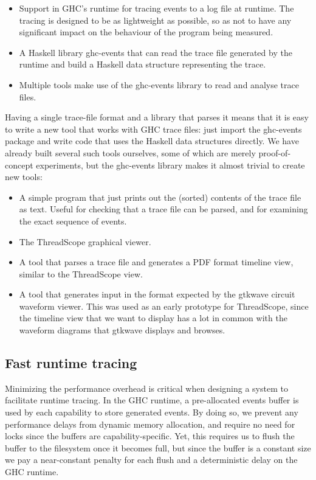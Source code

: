 \documentclass[twocolumn,9pt]{sigplanconf}
\newcommand{\codef}[1]{{\fontfamily{cmss}\small#1}}
\begin{document}
\begin{itemize}
\item Support in GHC's runtime for tracing events to a log file at
  runtime.  The tracing is designed to be as lightweight as possible,
  so as not to have any significant impact on the behaviour of the
  program being measured.

\item A Haskell library \codef{ghc-events} that can read the trace file
  generated by the runtime and build a Haskell data structure
  representing the trace.

\item Multiple tools make use of the \codef{ghc-events} library to read and
  analyse trace files.
\end{itemize}

Having a single trace-file format and a library that parses it means
that it is easy to write a new tool that works with GHC trace files:
just import the \codef{ghc-events} package and write code that uses the
Haskell data structures directly.  We have already built several such
tools ourselves, some of which are merely proof-of-concept
experiments, but the \codef{ghc-events} library makes it almost trivial to
create new tools:

\begin{itemize}
\item A simple program that just prints out the (sorted) contents of
  the trace file as text.  Useful for checking that a trace file can
  be parsed, and for examining the exact sequence of events.

\item The ThreadScope graphical viewer.

\item A tool that parses a trace file and generates a PDF format
  timeline view, similar to the ThreadScope view.

\item A tool that generates input in the format expected by the
  gtkwave circuit waveform viewer.  This was used as an early
  prototype for ThreadScope, since the timeline view that we want to
  display has a lot in common with the waveform diagrams that gtkwave
  displays and browses.
\end{itemize}

\subsection{Fast runtime tracing}
Minimizing the performance overhead is critical when designing a system
to facilitate runtime tracing.  In the GHC runtime, a pre-allocated events buffer is 
used by each capability to store generated events.
By doing so, we prevent any performance delays from dynamic 
memory allocation, and require no need for locks since the buffers are
capability-specific.  Yet, this requires us to flush the buffer
to the filesystem once it becomes full, but since the buffer is a
constant size we pay a near-constant penalty for each flush and a
deterministic delay on the GHC runtime.
\end{document}
